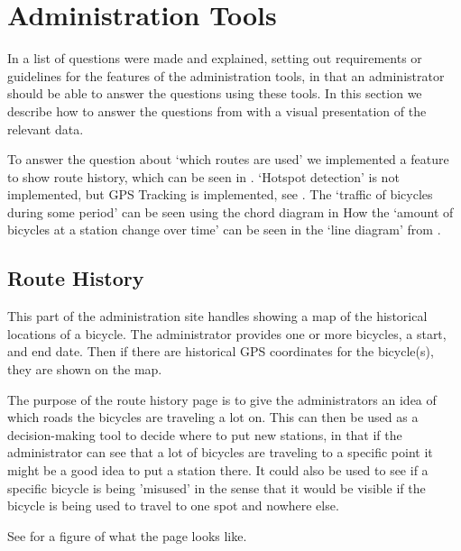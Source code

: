 \section{Administration Tools}\label{sec:impAdminTools}
In  a list of questions were made and explained, setting out requirements or guidelines for the features of the administration tools, in that an administrator should be able to answer the questions using these tools. 
In this section we describe how to answer the questions from  with a visual presentation of the relevant data.

To answer the question about `which routes are used' we implemented a feature to show route history, which can be seen in .
`Hotspot detection' is not implemented, but GPS Tracking is implemented, see .
The `traffic of bicycles during some period' can be seen using the chord diagram in 
How the `amount of bicycles at a station change over time' can be seen in the `line diagram' from  .

\subsection{Route History}\label{sec:routeHistory}
This part of the administration site handles showing a map of the historical locations of a bicycle.
The administrator provides one or more bicycles, a start, and end date.
Then if there are historical GPS coordinates for the bicycle(s), they are shown on the map. 

The purpose of the route history page is to give the administrators an idea of which roads the bicycles are traveling a lot on. 
This can then be used as a decision-making tool to decide where to put new stations, in that if the administrator can see that a lot of bicycles are traveling to a specific point it might be a good idea to put a station there.
It could also be used to see if a specific bicycle is being 'misused' in the sense that it would be visible if the bicycle is being used to travel to one spot and nowhere else.

See  for a figure of what the page looks like.

